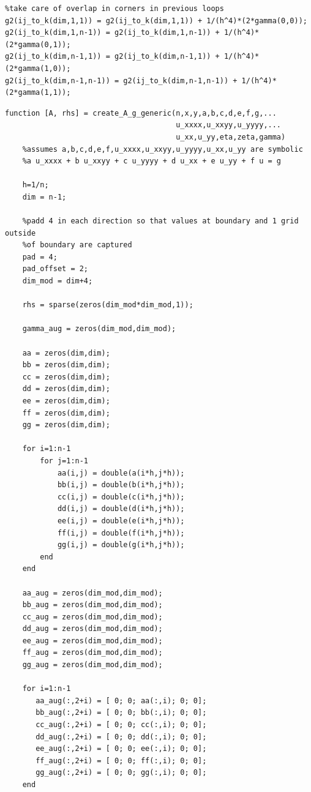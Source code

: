 \documentclass[12pt,letter]{article}
\begin{document}
\begin{enumerate}
\begin{enumerate}
\begin{verbatim}
%take care of overlap in corners in previous loops
g2(ij_to_k(dim,1,1)) = g2(ij_to_k(dim,1,1)) + 1/(h^4)*(2*gamma(0,0));
g2(ij_to_k(dim,1,n-1)) = g2(ij_to_k(dim,1,n-1)) + 1/(h^4)*(2*gamma(0,1));
g2(ij_to_k(dim,n-1,1)) = g2(ij_to_k(dim,n-1,1)) + 1/(h^4)*(2*gamma(1,0));
g2(ij_to_k(dim,n-1,n-1)) = g2(ij_to_k(dim,n-1,n-1)) + 1/(h^4)*(2*gamma(1,1));
\end{verbatim}

\pagebreak

\begin{verbatim}
function [A, rhs] = create_A_g_generic(n,x,y,a,b,c,d,e,f,g,...
                                       u_xxxx,u_xxyy,u_yyyy,...
                                       u_xx,u_yy,eta,zeta,gamma)
    %assumes a,b,c,d,e,f,u_xxxx,u_xxyy,u_yyyy,u_xx,u_yy are symbolic
    %a u_xxxx + b u_xxyy + c u_yyyy + d u_xx + e u_yy + f u = g
    
    h=1/n;
    dim = n-1;
    
    %padd 4 in each direction so that values at boundary and 1 grid outside
    %of boundary are captured
    pad = 4;
    pad_offset = 2;
    dim_mod = dim+4;
    
    rhs = sparse(zeros(dim_mod*dim_mod,1));

    gamma_aug = zeros(dim_mod,dim_mod);
    
    aa = zeros(dim,dim);
    bb = zeros(dim,dim);
    cc = zeros(dim,dim);
    dd = zeros(dim,dim);
    ee = zeros(dim,dim);
    ff = zeros(dim,dim);
    gg = zeros(dim,dim);
    
    for i=1:n-1
        for j=1:n-1
            aa(i,j) = double(a(i*h,j*h));
            bb(i,j) = double(b(i*h,j*h));
            cc(i,j) = double(c(i*h,j*h));
            dd(i,j) = double(d(i*h,j*h));
            ee(i,j) = double(e(i*h,j*h));
            ff(i,j) = double(f(i*h,j*h));
            gg(i,j) = double(g(i*h,j*h));
        end
    end
    
    aa_aug = zeros(dim_mod,dim_mod);
    bb_aug = zeros(dim_mod,dim_mod);
    cc_aug = zeros(dim_mod,dim_mod);
    dd_aug = zeros(dim_mod,dim_mod);
    ee_aug = zeros(dim_mod,dim_mod);
    ff_aug = zeros(dim_mod,dim_mod);
    gg_aug = zeros(dim_mod,dim_mod);
    
    for i=1:n-1
       aa_aug(:,2+i) = [ 0; 0; aa(:,i); 0; 0];
       bb_aug(:,2+i) = [ 0; 0; bb(:,i); 0; 0];
       cc_aug(:,2+i) = [ 0; 0; cc(:,i); 0; 0];
       dd_aug(:,2+i) = [ 0; 0; dd(:,i); 0; 0];
       ee_aug(:,2+i) = [ 0; 0; ee(:,i); 0; 0];
       ff_aug(:,2+i) = [ 0; 0; ff(:,i); 0; 0];
       gg_aug(:,2+i) = [ 0; 0; gg(:,i); 0; 0];
    end
    

\end{verbatim}
\end{enumerate}
\end{enumerate}
\end{document}
